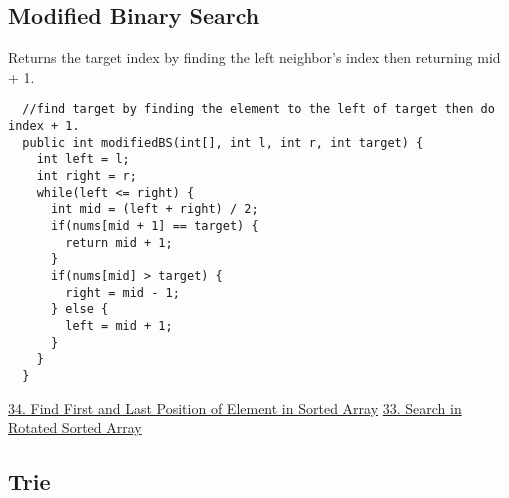\documentclass{article}
\begin{document}
  \subsection{Modified Binary Search}
  Returns the target index by finding the left neighbor's index then returning mid + 1.
  \begin{lstlisting}
  //find target by finding the element to the left of target then do index + 1.
  public int modifiedBS(int[], int l, int r, int target) {
    int left = l;
    int right = r;
    while(left <= right) {
      int mid = (left + right) / 2;
      if(nums[mid + 1] == target) {
        return mid + 1;
      }
      if(nums[mid] > target) {
        right = mid - 1;
      } else {
        left = mid + 1;
      }
    }
  }
  \end{lstlisting}
  \href{https://leetcode.com/problems/find-first-and-last-position-of-element-in-sorted-array/}{34. Find First and Last Position of Element in Sorted Array} \quad \href{https://leetcode.com/problems/search-in-rotated-sorted-array/submissions/}{33. Search in Rotated Sorted Array}
  \subsection{Trie}
\end{document}
